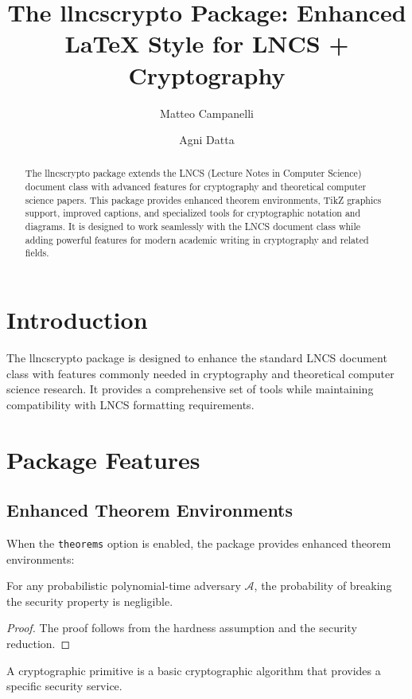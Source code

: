 \documentclass{llncs}
\title{The \textsf{llncscrypto} Package: Enhanced LaTeX Style for LNCS + Cryptography}
\author{Matteo Campanelli \and Agni Datta}
\institute{Some Randomly Sampled University}
\begin{document}
\maketitle

\begin{abstract}
    The \textsf{llncscrypto} package extends the LNCS (Lecture Notes in Computer Science) document class with advanced features for cryptography and theoretical computer science papers. This package provides enhanced theorem environments, TikZ graphics support, improved captions, and specialized tools for cryptographic notation and diagrams. It is designed to work seamlessly with the LNCS document class while adding powerful features for modern academic writing in cryptography and related fields.
\end{abstract}

\section{Introduction}

The \textsf{llncscrypto} package is designed to enhance the standard LNCS
document class with features commonly needed in cryptography and theoretical
computer science research. It provides a comprehensive set of tools while
maintaining compatibility with LNCS formatting requirements.

\section{Package Features}

\subsection{Enhanced Theorem Environments}

When the \texttt{theorems} option is enabled, the package provides enhanced
theorem environments:

\begin{theorem}\label{thm:security}
    For any probabilistic polynomial-time adversary $\mathcal{A}$, the probability of breaking the security property is negligible.
\end{theorem}

\begin{proof}
    The proof follows from the hardness assumption and the security reduction.
\end{proof}

\begin{definition}\label{def:primitive}
    A cryptographic primitive is a basic cryptographic algorithm that provides a specific security service.
\end{definition}
\end{document}
